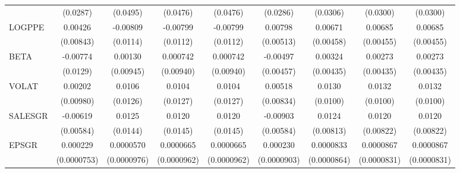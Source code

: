 \begin{table}[htbp]
\begin{tabular}{l*{8}{c}}
                    &    (0.0287)         &    (0.0495)         &    (0.0476)         &    (0.0476)         &    (0.0286)         &    (0.0306)         &    (0.0300)         &    (0.0300)         \\
LOGPPE              &     0.00426         &    -0.00809         &    -0.00799         &    -0.00799         &     0.00798         &     0.00671         &     0.00685         &     0.00685         \\
                    &   (0.00843)         &    (0.0114)         &    (0.0112)         &    (0.0112)         &   (0.00513)         &   (0.00458)         &   (0.00455)         &   (0.00455)         \\
BETA                &    -0.00774         &     0.00130         &    0.000742         &    0.000742         &    -0.00497         &     0.00324         &     0.00273         &     0.00273         \\
                    &    (0.0129)         &   (0.00945)         &   (0.00940)         &   (0.00940)         &   (0.00457)         &   (0.00435)         &   (0.00435)         &   (0.00435)         \\
VOLAT               &     0.00202         &      0.0106         &      0.0104         &      0.0104         &     0.00518         &      0.0130         &      0.0132         &      0.0132         \\
                    &   (0.00980)         &    (0.0126)         &    (0.0127)         &    (0.0127)         &   (0.00834)         &    (0.0100)         &    (0.0100)         &    (0.0100)         \\
SALESGR             &    -0.00619         &      0.0125         &      0.0120         &      0.0120         &    -0.00903         &      0.0124         &      0.0120         &      0.0120         \\
                    &   (0.00584)         &    (0.0144)         &    (0.0145)         &    (0.0145)         &   (0.00584)         &   (0.00813)         &   (0.00822)         &   (0.00822)         \\
EPSGR               &    0.000229\sym{***}&   0.0000570         &   0.0000665         &   0.0000665         &    0.000230\sym{**} &   0.0000833         &   0.0000867         &   0.0000867         \\
                    & (0.0000753)         & (0.0000976)         & (0.0000962)         & (0.0000962)         & (0.0000903)         & (0.0000864)         & (0.0000831)         & (0.0000831)         \\

\end{tabular}
\end{table}
